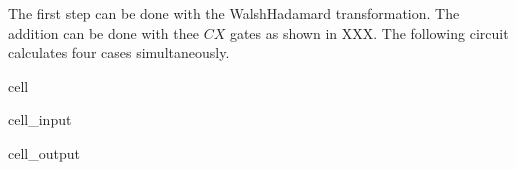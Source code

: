 \documentclass[letterpaper,10pt,english]{jupyterBook}
\begin{document}
\sphinxAtStartPar
The first step can be done with the Walsh\sphinxhyphen{}Hadamard transformation.  The addition can be done with thee \(CX\) gates as shown in XXX. The following circuit calculates four cases simultaneously.

\begin{sphinxuseclass}{cell}\begin{sphinxVerbatimInput}

\begin{sphinxuseclass}{cell_input}
\begin{sphinxVerbatim}[commandchars=\\\{\}]
   


\PYG{p}{[}\PYG{p}{]}
\end{sphinxVerbatim}

\end{sphinxuseclass}\end{sphinxVerbatimInput}
\begin{sphinxVerbatimOutput}

\begin{sphinxuseclass}{cell_output}
\noindent{}

\end{sphinxuseclass}\end{sphinxVerbatimOutput}

\end{sphinxuseclass}
\end{document}
